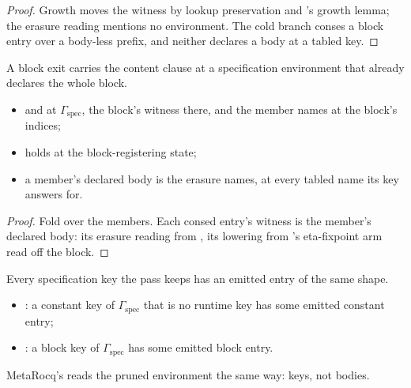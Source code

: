\begin{proof}
\leanok
{}
 Growth moves the witness by lookup preservation and \Lower{}'s growth lemma; the erasure
reading mentions no environment. The cold branch conses a block entry over a body-less prefix, and
neither declares a body at a tabled key.
\end{proof}
\begin{lemma}
\label{lem:RegContent-recConst}
\leanok
{}
 A block exit carries the content clause at a specification environment that already
declares the whole block.
\begin{itemize}
\item {}  and  at $\Gamma_{\mathrm{spec}}$, the block's
 witness there, and the member names at the block's indices;
\item {}  holds at the block-registering state;
\item a member's declared body is the erasure  names, at every tabled name its
key answers for.
\end{itemize}
\end{lemma}
\begin{proof}
\leanok
{}
 Fold over the members. Each consed entry's witness is the member's declared body: its
erasure reading from , its lowering from \Lower{}'s eta-fixpoint arm read off the block.
\end{proof}
\begin{definition}
\label{def:SpecKeysEmitted}
\leanok
{}
 Every specification key the pass keeps has an emitted entry of the same shape.
\begin{itemize}
\item {}: a constant key of $\Gamma_{\mathrm{spec}}$ that is no runtime key has some emitted
constant entry;
\item {}: a block key of $\Gamma_{\mathrm{spec}}$ has some emitted block entry.
\end{itemize}
 MetaRocq's  reads the pruned environment the same way: keys,
not bodies.
\end{definition}
